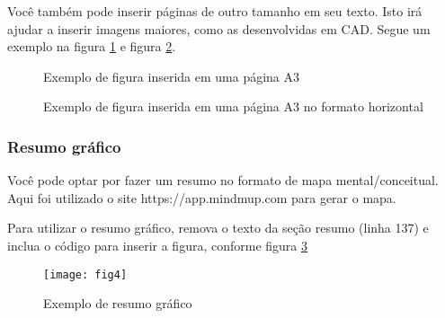 \documentclass[	DIV=calc,%
							paper=a4,%
							fontsize=12pt,%
							onecolumn]{scrartcl}	 					%
\begin{document}
Você também pode inserir páginas de outro tamanho em seu texto. Isto irá ajudar a inserir imagens maiores, como as desenvolvidas em CAD. Segue um exemplo na figura \ref{fig4} e figura \ref{fig5}.


\clearpage
{}
\recalctypearea

\begin{figure}
	\centering
	\caption{Exemplo de figura inserida em uma página A3}
	\label{fig4}
\end{figure}

\clearpage
{}
\recalctypearea


\clearpage
{}
\recalctypearea

	
\begin{figure}
	\noindent{}
	\caption{Exemplo de figura inserida em uma página A3 no formato horizontal}
	\label{fig5}
\end{figure}

\clearpage
{}
\recalctypearea


\subsubsection{Resumo gráfico}

Você pode optar por fazer um resumo no formato de mapa mental/conceitual. 
Aqui foi utilizado o site https://app.mindmup.com para gerar o mapa.

Para utilizar o resumo gráfico, remova o texto da seção resumo (linha 137) e inclua o código para inserir a figura, conforme figura \ref{fig6}

\begin{figure}[h]
	\centering
	\texttt{[image: fig4]}
	\caption{Exemplo de resumo gráfico}
	\label{fig6}	
\end{figure}

\end{document}
